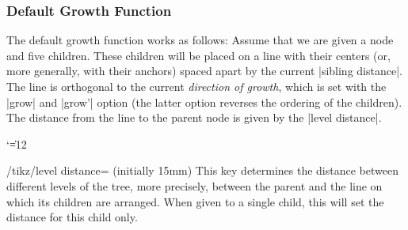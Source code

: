 \subsubsection{Default Growth Function}

The default growth function works as follows: Assume that we are given
a node and five children. These children will be placed on a line with
their centers (or, more generally, with their anchors) spaced apart by
the current |sibling distance|. The line is
orthogonal to the current \emph{direction of growth}, which is set
with the |grow| and |grow'| option (the latter option reverses the
ordering of the children). The distance from the line to the parent node
is given by the |level distance|.

{\catcode`\|=12
\begin{codeexample}[]
\end{codeexample}
}

\begin{key}{/tikz/level distance= (initially 15mm)}
  This key determines the distance between different levels of the
  tree, more precisely, between the parent and the line
  on which its children are arranged. When given to a single child,
  this will set the distance for this child only.

\begin{codeexample}[]
\end{codeexample}

\begin{codeexample}[]
\end{codeexample}
\end{key}

